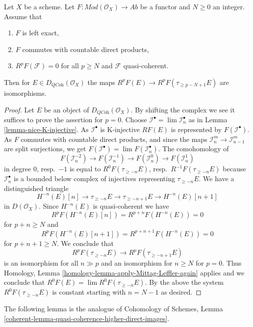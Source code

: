 \begin{lemma}
\label{lemma-application-nice-K-injective}
Let $X$ be a scheme. Let $F : \textit{Mod}(\mathcal{O}_X) \to \textit{Ab}$
be a functor and $N \geq 0$ an integer. Assume that
\begin{enumerate}
\item $F$ is left exact,
\item $F$ commutes with countable direct products,
\item $R^pF(\mathcal{F}) = 0$ for all $p \geq N$ and $\mathcal{F}$
quasi-coherent.
\end{enumerate}
Then for $E \in D_{\textit{QCoh}}(\mathcal{O}_X)$ the maps
$R^pF(E) \to R^pF(\tau_{\geq p - N + 1}E)$ are isomorphisms.
\end{lemma}

\begin{proof}
Let $E$ be an object of $D_{\textit{QCoh}}(\mathcal{O}_X)$.
By shifting the complex we see it suffices to prove the assertion
for $p = 0$. Choose $\mathcal{I}^\bullet = \lim \mathcal{I}_n^\bullet$
as in Lemma \ref{lemma-nice-K-injective}.
As $\mathcal{I}^\bullet$ is K-injective $RF(E)$ is represented by
$F(\mathcal{I}^\bullet)$. As $F$ commutes with countable direct
products, and since the maps $\mathcal{I}_n^m \to \mathcal{I}_{n - 1}^m$
are split surjections, we get
$F(\mathcal{I}^\bullet) = \lim F(\mathcal{I}_n^\bullet)$.
The comohomology of
$$
F(\mathcal{I}_n^{-2}) \to
F(\mathcal{I}_n^{-1}) \to
F(\mathcal{I}_n^0) \to
F(\mathcal{I}_n^1)
$$
in degree $0$, resp.\ $-1$ is equal to $R^0F(\tau_{\geq -n}E)$,
resp.\ $R^{-1}F(\tau_{\geq -n}E)$ because $\mathcal{I}_n^\bullet$
is a bounded below complex of injectives representing $\tau_{\geq -n}E$.
We have a distinguished triangle
$$
H^{-n}(E)[n] \to \tau_{\geq -n}E \to \tau_{\geq - n + 1}E \to H^{-n}(E)[n + 1]
$$
in $D(\mathcal{O}_X)$. Since $H^{-n}(E)$ is quasi-coherent we have
$$
R^pF(H^{-n}(E)[n]) = R^{p + n}F(H^{-n}(E)) = 0
$$
for $p + n \geq N$ and
$$
R^pF(H^{-n}(E)[n + 1]) = R^{p + n + 1}F(H^{-n}(E)) = 0
$$
for $p + n + 1 \geq N$. We conclude that
$$
R^pF(\tau_{\geq -n}E) \to R^pF(\tau_{\geq - n + 1}E)
$$
is an isomorphism for all $n \gg p$ and an isomorphism for
$n \geq N$ for $p = 0$. Thus
Homology, Lemma \ref{homology-lemma-apply-Mittag-Leffler-again}
applies and we conclude that $R^0F(E) = \lim R^0F(\tau_{\geq - n}E)$.
By the above the system $R^0F(\tau_{\geq - n}E)$ is constant starting
with $n = N - 1$ as desired.
\end{proof}

\noindent
The following lemma is the analogue of
Cohomology of Schemes, Lemma
\ref{coherent-lemma-quasi-coherence-higher-direct-images}.

